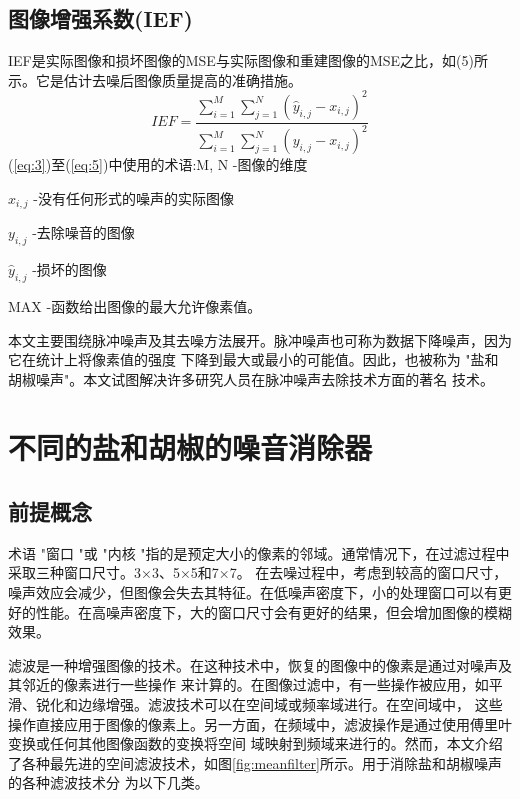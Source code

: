 \documentclass[12pt]{article} %
\begin{document}
\subsection{图像增强系数(IEF)}
IEF是实际图像和损坏图像的MSE与实际图像和重建图像的MSE之比，如(5)所示。它是估计去噪后图像质量提高的准确措施。
\begin{equation}
    IEF=\frac{\sum_{i=1}^M\sum_{j=1}^N(\hat{y}_{i,j}-x_{i,j})^2}{\sum_{i=1}^M\sum_{j=1}^N(y_{i,j}-x_{i,j})^2}
    \label{eq:5}
\end{equation}
(\ref{eq:3})至(\ref{eq:5})中使用的术语:M, N -图像的维度\par
\hspace{2em}$x_{i,j}$ -没有任何形式的噪声的实际图像\par
\hspace{2em}$y_{i,j}$ -去除噪音的图像\par
\hspace{2em}$\hat{y}_{i,j}$ -损坏的图像\par
\hspace{2em}MAX -函数给出图像的最大允许像素值。\par
\hspace{2em}本文主要围绕脉冲噪声及其去噪方法展开。脉冲噪声也可称为数据下降噪声，因为它在统计上将像素值的强度
下降到最大或最小的可能值。因此，也被称为 "盐和胡椒噪声"。本文试图解决许多研究人员在脉冲噪声去除技术方面的著名
技术。

\section{不同的盐和胡椒的噪音消除器\label{sec:3}}
\subsection{前提概念}
术语 "窗口 "或 "内核 "指的是预定大小的像素的邻域。通常情况下，在过滤过程中采取三种窗口尺寸。3×3、5×5和7×7。
在去噪过程中，考虑到较高的窗口尺寸，噪声效应会减少，但图像会失去其特征。在低噪声密度下，小的处理窗口可以有更
好的性能。在高噪声密度下，大的窗口尺寸会有更好的结果，但会增加图像的模糊效果。

\hspace{2em}滤波是一种增强图像的技术。在这种技术中，恢复的图像中的像素是通过对噪声及其邻近的像素进行一些操作
来计算的。在图像过滤中，有一些操作被应用，如平滑、锐化和边缘增强。滤波技术可以在空间域或频率域进行。在空间域中，
这些操作直接应用于图像的像素上。另一方面，在频域中，滤波操作是通过使用傅里叶变换或任何其他图像函数的变换将空间
域映射到频域来进行的。然而，本文介绍了各种最先进的空间滤波技术，如图\ref{fig:meanfilter}所示。用于消除盐和胡椒噪声的各种滤波技术分
为以下几类。
\end{document}
